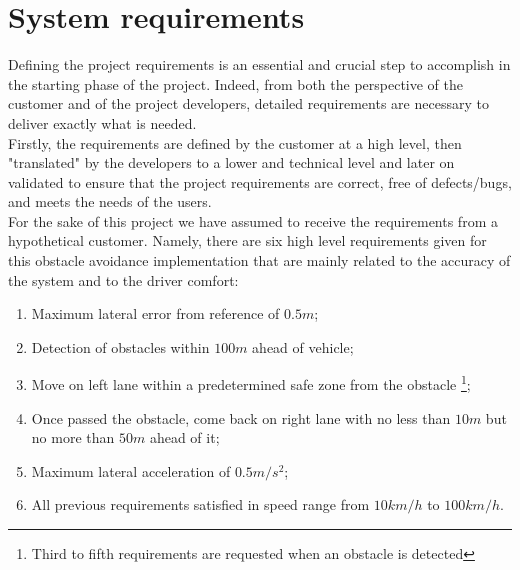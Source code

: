 \section{System requirements}


Defining the project requirements is an essential and crucial step to accomplish in the starting phase of the project. Indeed, from both the perspective of the customer and of the project developers, detailed requirements are necessary to deliver exactly what is needed.\\
Firstly, the requirements are defined by the customer at a high level, then "translated" by the developers to a lower and technical level and later on validated to ensure that the project requirements are correct, free of defects/bugs, and meets the needs of the users.\\
For the sake of this project we have assumed to receive the requirements from a hypothetical customer.
Namely, there are six high level requirements given for this obstacle avoidance implementation that are mainly related to the accuracy of the system and to the driver comfort:
\begin{enumerate}
    \item Maximum lateral error from reference of $0.5 m$;
    \item Detection of obstacles within $100 m$ ahead of vehicle;
    \item Move on left lane within a predetermined safe zone from the obstacle \footnote{Third to fifth requirements are requested when an obstacle is detected};
    \item Once passed the obstacle, come back on right lane with no less than $10 m$ but no more than $50 m$ ahead of it;
    \item Maximum lateral acceleration of $0.5 m/s^2$;
    \item All previous requirements satisfied in speed range from $10 km/h$ to $100 km/h$.
\end{enumerate}
